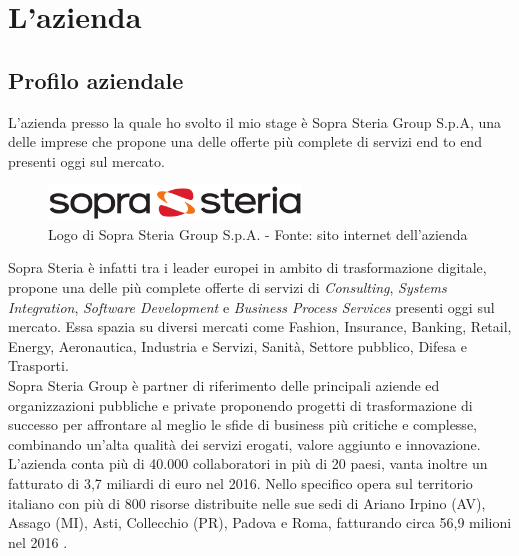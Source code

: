 
\chapter{L'azienda}
\label{cap:azienda}
\section{Profilo aziendale}
L'azienda presso la quale ho svolto il mio stage è Sopra Steria Group S.p.A, una delle imprese che propone una delle offerte più complete di servizi end to end presenti oggi sul mercato.\\

\begin{figure}[H]
	\centering
   	\includegraphics[width=0.6\textwidth]{immagini/logo_azienda}
   	\caption{Logo di Sopra Steria Group S.p.A. - Fonte: sito internet dell'azienda}
\end{figure}

Sopra Steria è infatti tra i leader europei in ambito di trasformazione digitale, propone una delle più complete offerte di servizi di \textit{Consulting}, \textit{Systems Integration}, \textit{Software Development} e \textit{Business Process Services} presenti oggi sul mercato.
Essa spazia su diversi mercati come Fashion, Insurance, Banking, Retail, Energy, Aeronautica, Industria e Servizi, Sanità, Settore pubblico, Difesa e Trasporti.\\

Sopra Steria Group è partner di riferimento delle principali aziende ed organizzazioni pubbliche e private proponendo progetti di trasformazione di successo per affrontare al meglio le sfide di business più critiche e complesse, combinando un'alta qualità dei servizi erogati, valore aggiunto e innovazione.\\

L'azienda conta più di 40.000 collaboratori in più di 20 paesi, vanta inoltre un fatturato di 3,7 miliardi di euro nel 2016. Nello specifico opera sul territorio italiano con più di 800 risorse distribuite nelle sue sedi di Ariano Irpino (AV), Assago (MI), Asti, Collecchio (PR), Padova e Roma, fatturando circa 56,9 milioni nel 2016 .\\

